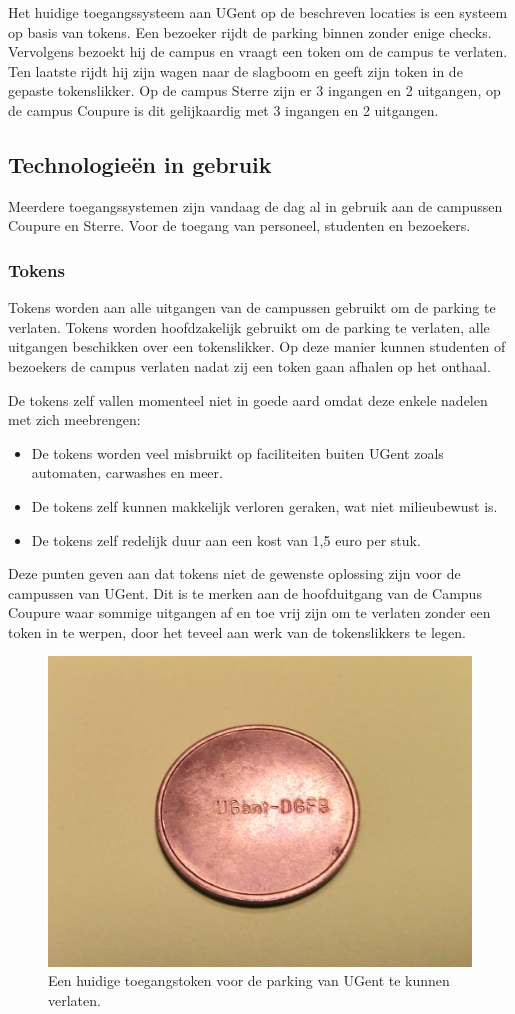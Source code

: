 Het huidige toegangssysteem aan UGent op de beschreven locaties is een systeem op basis van tokens. Een bezoeker rijdt de parking binnen zonder enige checks. Vervolgens bezoekt hij de campus en vraagt een token om de campus te verlaten. Ten laatste rijdt hij zijn wagen naar de slagboom en geeft zijn token in de gepaste tokenslikker.
Op de campus Sterre zijn er 3 ingangen en 2 uitgangen, op de campus Coupure is dit gelijkaardig met 3 ingangen en 2 uitgangen.

\subsection{Technologieën in gebruik}
Meerdere toegangssystemen zijn vandaag de dag al in gebruik aan de campussen Coupure en Sterre. Voor de toegang van personeel, studenten en bezoekers.

\subsubsection{Tokens}

Tokens worden aan alle uitgangen van de campussen gebruikt om de parking te verlaten.
Tokens worden hoofdzakelijk gebruikt om de parking te verlaten, alle uitgangen beschikken over een tokenslikker. Op deze manier kunnen studenten of bezoekers de campus verlaten nadat zij een token gaan afhalen op het onthaal.

De tokens zelf vallen momenteel niet in goede aard omdat deze enkele nadelen met zich meebrengen:
\begin{itemize}
	\item De tokens worden veel misbruikt op faciliteiten buiten UGent zoals automaten, carwashes en meer.
	\item De tokens zelf kunnen makkelijk verloren geraken, wat niet milieubewust is.
	\item De tokens zelf redelijk duur aan een kost van 1,5 euro per stuk.
\end{itemize}

Deze punten geven aan dat tokens niet de gewenste oplossing zijn voor de campussen van UGent. Dit is te merken aan de hoofduitgang van de Campus Coupure waar sommige uitgangen af en toe vrij zijn om te verlaten zonder een token in te werpen, door het teveel aan werk van de tokenslikkers te legen.

\begin{figure}[h!]
	\centering
	\includegraphics[width=0.5\linewidth]{img/token.jpg}
	\caption{Een huidige toegangstoken voor de parking van UGent te kunnen verlaten.}
\end{figure}

